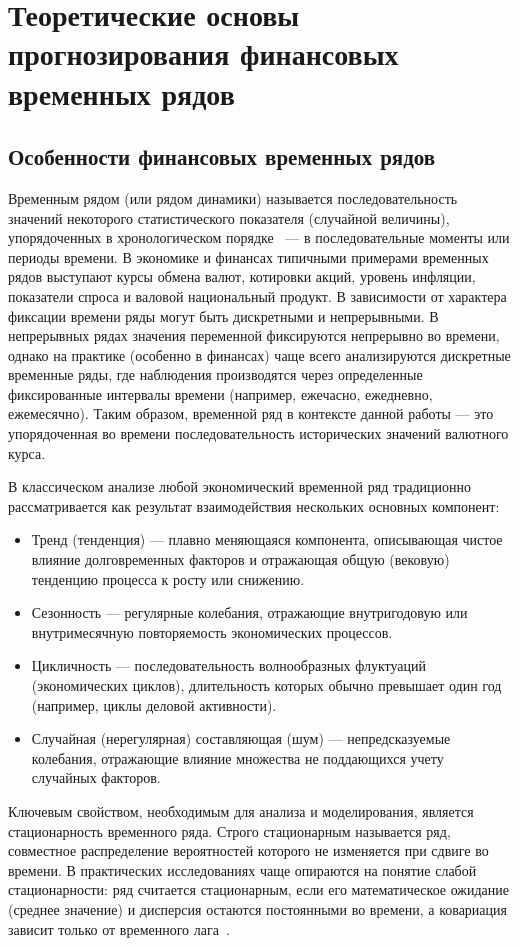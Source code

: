 \chapter{Теоретические основы прогнозирования финансовых временных рядов}

\section{Особенности финансовых временных рядов}
Временным рядом (или рядом динамики) называется последовательность значений некоторого статистического показателя (случайной величины), упорядоченных в хронологическом порядке~\cite{hamilton1994, afanasev2001} — в последовательные моменты или периоды времени. В экономике и финансах типичными примерами временных рядов выступают курсы обмена валют, котировки акций, уровень инфляции, показатели спроса и валовой национальный продукт. В зависимости от характера фиксации времени ряды могут быть дискретными и непрерывными. В непрерывных рядах значения переменной фиксируются непрерывно во времени, однако на практике (особенно в финансах) чаще всего анализируются дискретные временные ряды, где наблюдения производятся через определенные фиксированные интервалы времени (например, ежечасно, ежедневно, ежемесячно). Таким образом, временной ряд в контексте данной работы — это упорядоченная во времени последовательность исторических значений валютного курса.

В классическом анализе любой экономический временной ряд традиционно рассматривается как результат взаимодействия нескольких основных компонент:
\begin{itemize}
    \item Тренд (тенденция) — плавно меняющаяся компонента, описывающая чистое влияние долговременных факторов и отражающая общую (вековую) тенденцию процесса к росту или снижению.
    \item Сезонность — регулярные колебания, отражающие внутригодовую или внутримесячную повторяемость экономических процессов.
    \item Цикличность — последовательность волнообразных флуктуаций (экономических циклов), длительность которых обычно превышает один год (например, циклы деловой активности).
    \item Случайная (нерегулярная) составляющая (шум) — непредсказуемые колебания, отражающие влияние множества не поддающихся учету случайных факторов.
\end{itemize}


Ключевым свойством, необходимым для анализа и моделирования, является стационарность временного ряда. Строго стационарным называется ряд, совместное распределение вероятностей которого не изменяется при сдвиге во времени. В практических исследованиях чаще опираются на понятие слабой стационарности: ряд считается стационарным, если его математическое ожидание (среднее значение) и дисперсия остаются постоянными во времени, а ковариация зависит только от временного лага~\cite{aivazyan2001v1}.

